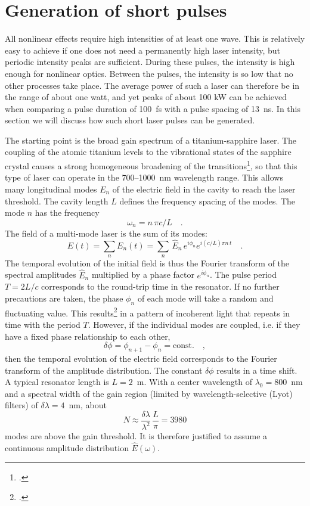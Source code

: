 \section{Generation of short pulses}


All nonlinear effects require high intensities of at least one wave. This is relatively easy to achieve if one does not need a permanently high laser intensity, but periodic intensity peaks are sufficient. During these pulses, the intensity is high enough for nonlinear optics. Between the pulses, the intensity is so low that no other processes take place. The average power of such a laser can therefore be in the range of about one watt, and yet peaks of about 100 kW can be achieved when comparing a pulse duration of 100~fs with a pulse spacing of 13~ns. In this section we will discuss how such short laser pulses can be generated.


The starting point is the broad gain spectrum of a titanium-sapphire laser. The coupling of the atomic titanium levels to the vibrational states of the sapphire crystal causes a strong homogeneous broadening of the transitions\footcite[chapter 4]{Rulliere2005}, so that this type of laser can operate in the 700--1000~nm wavelength range. This allows many longitudinal modes $E_n$ of the electric field in the cavity to reach the laser threshold. The cavity length $L$ defines the frequency spacing of the modes. The mode $n$ has the frequency 
\begin{equation}
 \omega_n = n \, \pi c / L \quad.
\end{equation}
The  field of a multi-mode laser is the sum of its modes:
\begin{equation}
  E(t) = \sum_n E_n(t) = \sum_n \, \hat{E}_n \, e^{i \phi_n} e^{i (c/L) \pi n \, t} \quad .
\end{equation}
The temporal evolution of the initial field is thus the Fourier transform of the spectral amplitudes $\hat{E}_n$ multiplied by a phase factor $e^{i \phi_n}$. The pulse period $T = 2L /c$ corresponds to the round-trip time in the resonator. If no further precautions are taken, the phase $\phi_n$ of each mode will take a random and fluctuating value. This results\footcite{DielsRudolph1996} in a pattern of incoherent light that repeats in time with the period $T$. However, if the individual modes are coupled, i.e. if they have a fixed phase relationship to each other,
\begin{equation}
   \delta \phi = \phi_{n+1} - \phi_n = \text{const.} \quad,
   \label{eq:fwm:gl_fwm_phiconst}
\end{equation}
then the temporal evolution of the electric field corresponds to the
Fourier transform of the amplitude distribution. The constant $\delta \phi$ results in a time shift. A typical resonator length is $L = 2$~m. With a center wavelength of $\lambda_0 = 800$~nm and a
spectral width of the gain region (limited by wavelength-selective (Lyot) filters) of $\delta \lambda = 4$~nm, about
\begin{equation}
 N \approx \frac{\delta \lambda}{ \lambda^2} \, \frac{L}{\pi} =
 3980
\end{equation}
modes are above the gain threshold. It is therefore justified to assume a continuous amplitude distribution $\hat{E}(\omega)$.


